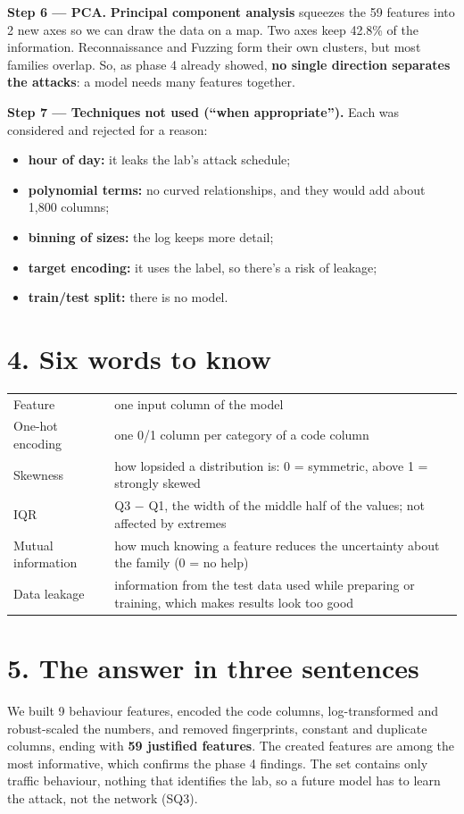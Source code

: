\documentclass[11pt,a4paper]{article}
\begin{document}
\textbf{Step 6 --- PCA.} \textbf{Principal component analysis} squeezes the 59 features into 2 new axes so we can draw
the data on a map. Two axes keep 42.8\% of the information. Reconnaissance and Fuzzing form their own clusters, but most
families overlap. So, as phase 4 already showed, \textbf{no single direction separates the attacks}: a model needs many
features together.

\textbf{Step 7 --- Techniques not used (``when appropriate'').} Each was considered and rejected for a reason:
\begin{itemize}
  \item \textbf{hour of day:} it leaks the lab's attack schedule;
  \item \textbf{polynomial terms:} no curved relationships, and they would add about 1,800 columns;
  \item \textbf{binning of sizes:} the log keeps more detail;
  \item \textbf{target encoding:} it uses the label, so there's a risk of leakage;
  \item \textbf{train/test split:} there is no model.
\end{itemize}

\section*{4. Six words to know}
\begin{tabular}{L{3.4cm}L{12.6cm}}
\toprule
Feature & one input column of the model \\
One-hot encoding & one 0/1 column per category of a code column \\
Skewness & how lopsided a distribution is: 0 = symmetric, above 1 = strongly skewed \\
IQR & Q3 $-$ Q1, the width of the middle half of the values; not affected by extremes \\
Mutual information & how much knowing a feature reduces the uncertainty about the family (0 = no help) \\
Data leakage & information from the test data used while preparing or training, which makes results look too good \\
\bottomrule
\end{tabular}

\section*{5. The answer in three sentences}
We built 9 behaviour features, encoded the code columns, log-transformed and robust-scaled the numbers, and removed
fingerprints, constant and duplicate columns, ending with \textbf{59 justified features}. The created features are among
the most informative, which confirms the phase 4 findings. The set contains only traffic behaviour, nothing that
identifies the lab, so a future model has to learn the attack, not the network (SQ3).
\end{document}
